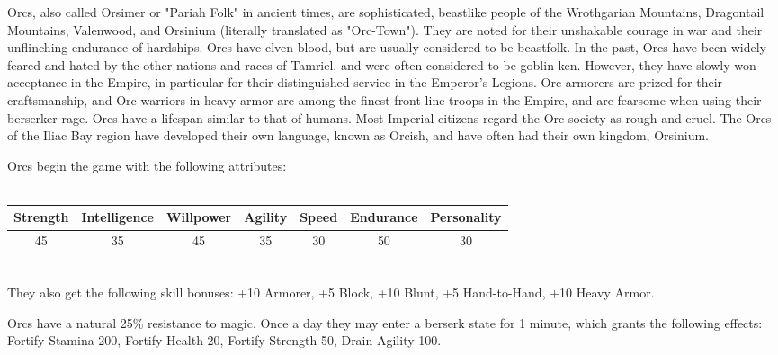 \documentclass[12pt]{article}
\begin{document}
Orcs, also called Orsimer or "Pariah Folk" in ancient times, are sophisticated, beastlike people of the Wrothgarian Mountains, Dragontail Mountains, Valenwood, and Orsinium (literally translated as "Orc-Town"). They are noted for their unshakable courage in war and their unflinching endurance of hardships. Orcs have elven blood, but are usually considered to be beastfolk. In the past, Orcs have been widely feared and hated by the other nations and races of Tamriel, and were often considered to be goblin-ken. However, they have slowly won acceptance in the Empire, in particular for their distinguished service in the Emperor's Legions. Orc armorers are prized for their craftsmanship, and Orc warriors in heavy armor are among the finest front-line troops in the Empire, and are fearsome when using their berserker rage. Orcs have a lifespan similar to that of humans. Most Imperial citizens regard the Orc society as rough and cruel. The Orcs of the Iliac Bay region have developed their own language, known as Orcish, and have often had their own kingdom, Orsinium.

Orcs begin the game with the following attributes:\\~\\
\begin{tabular}{|c|c|c|c|c|c|c|}
\hline
Strength & Intelligence & Willpower & Agility & Speed & Endurance & Personality\\ \hline
45 & 35 & 45 & 35 & 30 & 50 & 30\\ \hline

\end{tabular}\\

They also get the following skill bonuses: +10 Armorer, +5 Block, +10 Blunt, +5 Hand-to-Hand, +10 Heavy Armor.

Orcs have a natural 25\% resistance to magic. Once a day they may enter a berserk state for 1 minute, which grants the following effects: Fortify Stamina 200, Fortify Health 20, Fortify Strength 50, Drain Agility 100.\\
\end{document}
